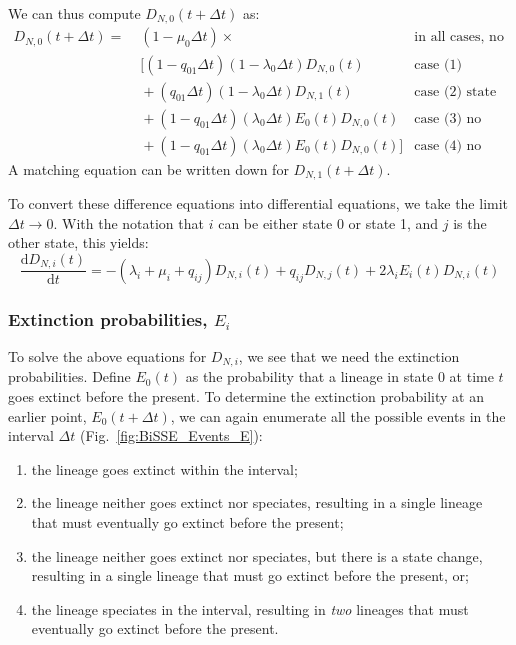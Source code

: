 We can thus compute $D_{N,0}(t + \Delta t)$ as:
\begin{align*}
	D_{N,0}(t + \Delta t) = & \;(1 - \mu_0 \Delta t) \times & \text{in all cases, no extinction of the observed lineage} \\
                         & \;[  (1 - q_{01} \Delta t)(1 - \lambda_0 \Delta t) D_{N,0}(t) & \text{case (1) nothing happens} \\
                         & \; + (q_{01} \Delta t) (1 - \lambda_0 \Delta t) D_{N,1}(t) & \text{case (2) state change but no speciation} \\
                         & \; + (1 - q_{01} \Delta t) (\lambda_0 \Delta t) E_0(t) D_{N,0}(t) & \text{case (3) no state change, speciation, extinction} \\
                         & \; + (1 - q_{01} \Delta t) (\lambda_0 \Delta t) E_0(t) D_{N,0}(t)] & \text{case (4) no state change, speciation, extinction}
\end{align*}
A matching equation can be written down for $D_{N,1}(t+\Delta t)$.

To convert these difference equations into differential equations, we take the limit $\Delta t \rightarrow 0$.
With the notation that $i$ can be either state 0 or state 1, and $j$ is the other state, this yields:
\begin{equation}
    \frac{\mathrm{d}D_{N,i}(t)}{\mathrm{d}t} = - \left(\lambda_i + \mu_i + q_{ij} \right) D_{N,i}(t) + q_{ij} D_{N,j}(t) + 2 \lambda_i E_i(t) D_{N,i}(t)
    \label{eq:BiSSE_D}
\end{equation}

\subsubsection{Extinction probabilities, $E_i$}

To solve the above equations for $D_{N, i}$, we see that we need the extinction probabilities.
Define $E_0(t)$ as the probability that a lineage in state 0 at time $t$ goes extinct before the present.
To determine the extinction probability at an earlier point, $E_0(t+\Delta t)$, we can again enumerate all the possible events in the interval $\Delta t$ (Fig.~\ref{fig:BiSSE_Events_E}):
\begin{enumerate}
	\item the lineage goes extinct within the interval;
	\item the lineage neither goes extinct nor speciates, resulting in a single lineage that must eventually go extinct before the present;
	\item the lineage neither goes extinct nor speciates, but there is a state change, resulting in a single lineage that must go extinct before the present, or;
	\item the lineage speciates in the interval, resulting in \emph{two} lineages that must eventually go extinct before the present.
\end{enumerate}

